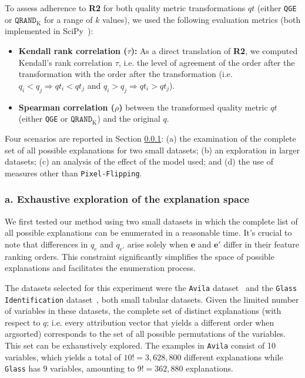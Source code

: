 To assess adherence to \textbf{R2} for both quality metric transformations $qt$ (either \texttt{QGE} or $\texttt{QRAND}_{\text{K}}$ for a range of $k$ values), we used the following evaluation metrics (both implemented in SciPy~\cite{2020SciPy-NMeth}):
\begin{itemize}
    \item \textbf{Kendall rank correlation ($\tau$):} As a direct translation of \textbf{R2}, we computed Kendall's rank correlation $\tau$, i.e. the level of agreement of the order after the transformation with the order after the transformation (i.e. $q_i<q_j \Longrightarrow qt_i<qt_j$ and $q_i>q_j \Longrightarrow qt_i>qt_j$).
    \item \textbf{Spearman correlation ($\rho$)} between the transformed quality metric $qt$ (either \texttt{QGE} or $\texttt{QRAND}_{\text{K}}$) and the original $q$.
\end{itemize}

Four scenarios are reported in Section \ref{sec:exhaustive_exploration}: (a) the examination of the complete set of all possible explanations for two small datasets; (b) an exploration in larger datasets; (c) an analysis of the effect of the model used; and (d) the use of measures other than \texttt{Pixel-Flipping}.

\subsubsection{a. Exhaustive exploration of the explanation space}\label{sec:exhaustive_exploration}
We first tested our method using two small datasets in which the complete list of all possible explanations can be enumerated in a reasonable time. It's crucial to note that differences in $q_e$ and $q_{e'}$ arise solely when $\mathbf{e}$ and $\mathbf{e'}$ differ in their feature ranking orders. This constraint significantly simplifies the space of possible explanations and facilitates the enumeration process.

The datasets selected for this experiment were the \texttt{Avila} dataset~\cite{avila_dataset} and the \texttt{Glass Identification} dataset~\cite{misc_glass_identification_42}, both small tabular datasets. Given the limited number of variables in these datasets, the complete set of distinct explanations (with respect to $q$; i.e. every attribution vector that yields a different order when argsorted) corresponds to the set of all possible permutations of the variables. This set can be exhaustively explored. The examples in \texttt{Avila} consist of 10 variables, which yields a total of $10!=3,628,800$ different explanations while \texttt{Glass} has 9 variables, amounting to $9!=362,880$ explanations.


